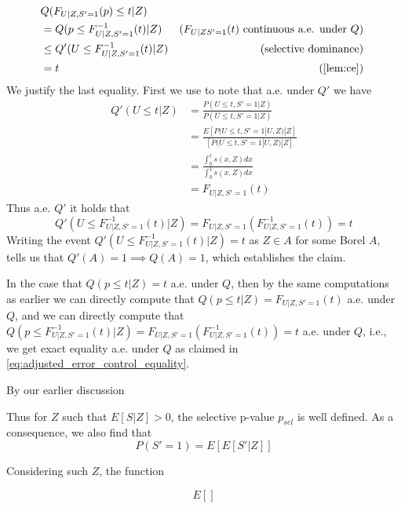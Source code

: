 \documentclass{article}
\begin{document}
\begin{appendix}
\begin{align*}
    &Q(F_{U | Z, S' = 1}(p) \leq t | Z)\\
     &= Q(p \leq F_{U | Z, S' = 1}^{-1}(t) | Z) & \text{($F_{U|Z S'=1}(t)$ continuous a.e. under $Q$) } \\
    &\leq Q'(U \leq F_{U |Z, S' = 1}^{-1}(t) |Z) & \text{(selective dominance) } \\
    &= t & \text{ (\Cref{lem:ce}) }
\end{align*}
We justify the last equality. First we use  to note that a.e. under $Q'$ we have 
\begin{align*}
    Q'(U \leq t |Z) &= \frac{P(U \leq t, S' = 1 | Z )}{P(U \leq t, S' = 1 | Z)}\\
                    &= \frac{E[P(U \leq t, S' = 1 | U, Z ) | Z ] }{[P(U \leq t, S' = 1 | U, Z)| Z]}\\
                    &= \frac{\int_0^t s(x, Z) dx }{\int_0^1 s(x, Z) dx}\\
                    &= F_{U| Z, S'=1}(t)
\end{align*}
Thus a.e. $Q'$ it holds that
\begin{equation*}
    Q'(U \leq F_{U |Z, S' = 1}^{-1}(t) |Z) = F_{U| Z, S'=1}(F^{-1}_{U| Z, S'=1}(t)) = t
\end{equation*}
Writing the event $Q'(U \leq F_{U |Z, S' = 1}^{-1}(t) |Z) = t$ as $Z \in A$ for some Borel $A$,  tells us that $Q'(A) = 1 \implies Q(A) = 1$, which establishes the claim. 

In the case that $Q(p \leq t | Z) = t$ a.e. under $Q$, then by the same computations as earlier we can directly compute that $Q(p \leq t | Z) = F_{U| Z, S'=1}(t)$ a.e. under $Q$, and we can directly compute that $Q(p \leq F^{-1}_{U | Z, S' = 1}(t) | Z) =  F_{U| Z, S'=1}(F^{-1}_{U | Z, S' = 1}(t)) = t $ a.e. under $Q$, i.e., we get exact equality a.e. under $Q$ as claimed in \eqref{eq:adjusted_error_control_equality}. 


\iffalse 
By our earlier discussion  

Thus for $Z$ such that $E[S | Z]> 0$, the selective p-value $p_{sel}$ is well defined. As a consequence, we also find that 
\begin{equation*}
    P(S'=1) = E[E[S' |Z]]
\end{equation*}

Considering such $Z$, the function 

\begin{equation*}
    E[]
\end{equation*}


\end{appendix}
\end{document}
